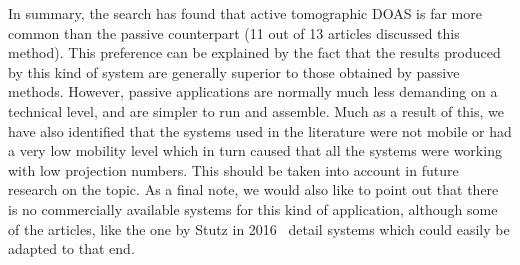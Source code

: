 In summary, the search has found that active tomographic \gls{DOAS} is
far more common than the passive counterpart (11 out of 13 articles
discussed this method). This preference can be explained by the fact
that the results produced by this kind of system are generally superior
to those obtained by passive methods. However, passive applications are
normally much less demanding on a technical level, and are simpler to
run and assemble.  Much as a result of this, we have also identified
that the systems used in the literature were not mobile or had a very
low mobility level which in turn caused that all the systems were
working with low projection numbers. This should be taken into account
in future research on the topic. As a final note, we would also like to
point out that there is no commercially available systems for this kind
of application, although some of the articles, like the one by Stutz in
2016~\cite{Stutz2016} detail systems which could easily be adapted to
that end.
